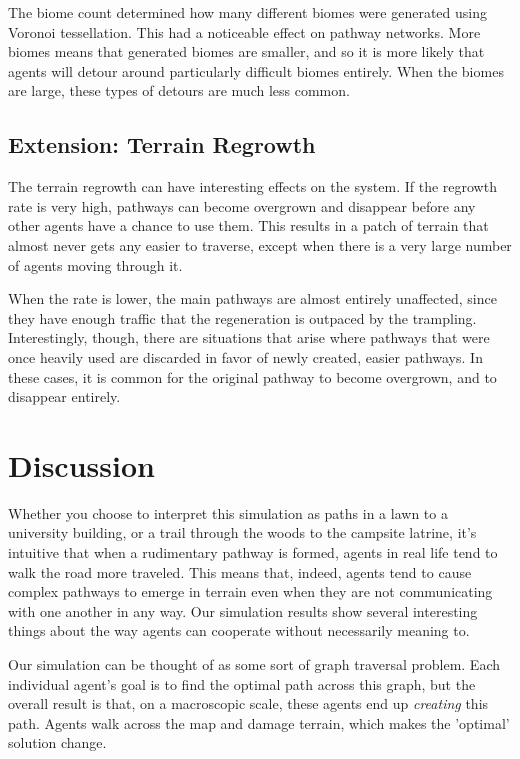 \documentclass[conference]{IEEEtran}
\begin{document}
The biome count determined how many different biomes were generated using Voronoi tessellation. This had a noticeable effect on pathway networks. More biomes means that generated biomes are smaller, and so it is more likely that agents will detour around particularly difficult biomes entirely. When the biomes are large, these types of detours are much less common.

\subsection{Extension: Terrain Regrowth}
The terrain regrowth can have interesting effects on the system. If the regrowth rate is very high, pathways can become overgrown and disappear before any other agents have a chance to use them. This results in a patch of terrain that almost never gets any easier to traverse, except when there is a very large number of agents moving through it.

When the rate is lower, the main pathways are almost entirely unaffected, since they have enough traffic that the regeneration is outpaced by the trampling. Interestingly, though, there are situations that arise where pathways that were once heavily used are discarded in favor of newly created, easier pathways. In these cases, it is common for the original pathway to become overgrown, and to disappear entirely.

\section{Discussion} 
	Whether you choose to interpret this simulation as paths in a lawn to a university building, or a trail through the woods to the campsite latrine, it's intuitive that when a rudimentary pathway is formed, agents in real life tend to walk the road more traveled. This means that, indeed, agents tend to cause complex pathways to emerge in terrain even when they are not communicating with one another in any way.	Our simulation results show several interesting things about the way agents can cooperate without necessarily meaning to. 
	
	Our simulation can be thought of as some sort of graph traversal problem. Each individual agent's goal is to find the optimal path across this graph, but the overall result is that, on a macroscopic scale, these agents end up \textit{creating} this path. Agents walk across the map and damage terrain, which makes the 'optimal' solution change. 
	
\end{document}
